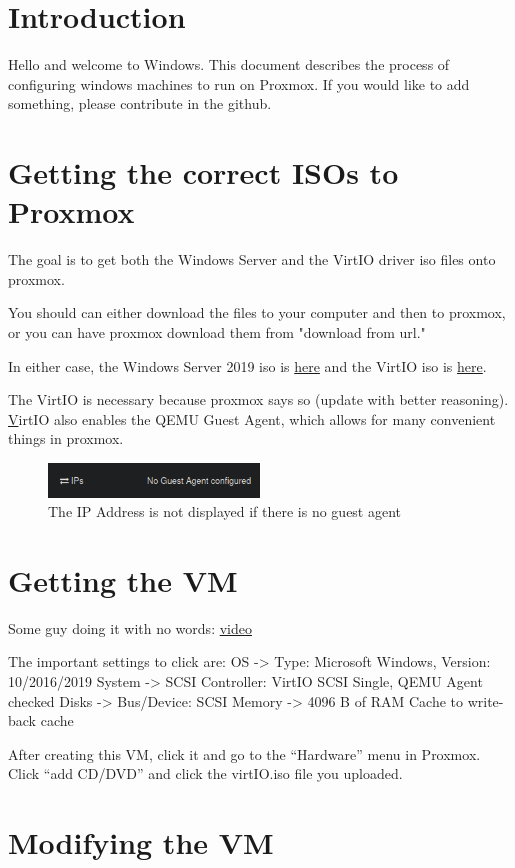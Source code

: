 \documentclass{article}
\begin{document}
\graphicspath{ {./Images/} }
\tableofcontents

\section{Introduction}
Hello and welcome to Windows. This document describes the process of configuring windows machines to run on Proxmox. If you would like to add something, please contribute in the github.

\section{Getting the correct ISOs to Proxmox}
The goal is to get both the Windows Server and the VirtIO driver iso files onto proxmox.

You should can either download the files to your computer and then to proxmox, or you can have proxmox download them from "download from url."

In either case, the Windows Server 2019 iso is \href{http://www.microsoft.com/en-us/evalcenter/download-windows-server-2019
}{here} and the VirtIO iso is \href{https://fedorapeople.org/groups/virt/virtio-win/direct-downloads/stable-virtio/}{here}.

The VirtIO is necessary because proxmox says so (update with better reasoning). \href{https://pve.proxmox.com/wiki/Windows_VirtIO_Drivers#Windows_OS_Support}

VirtIO also enables the QEMU Guest Agent, which allows for many convenient things in proxmox.

\begin{figure}[h]
    \centering
    \includegraphics[width=0.5\textwidth]{noGuestAgent.png}
    \caption{The IP Address is not displayed if there is no guest agent}
    \label{fig:noGuestAgent}
\end{figure}

\section{Getting the VM}
Some guy doing it with no words: \href{https://www.youtube.com/watch?v=lwORpWEHiDE&t=5m}{video}

The important settings to click are:
OS -> Type: Microsoft Windows, Version: 10/2016/2019
System -> SCSI Controller: VirtIO SCSI Single, QEMU Agent checked
Disks -> Bus/Device: SCSI
Memory -> 4096 B of RAM
Cache to write-back cache

After creating this VM, click it and go to the “Hardware” menu in Proxmox. Click “add CD/DVD” and click the virtIO.iso file you uploaded.
\section{Modifying the VM}
\end{document}
